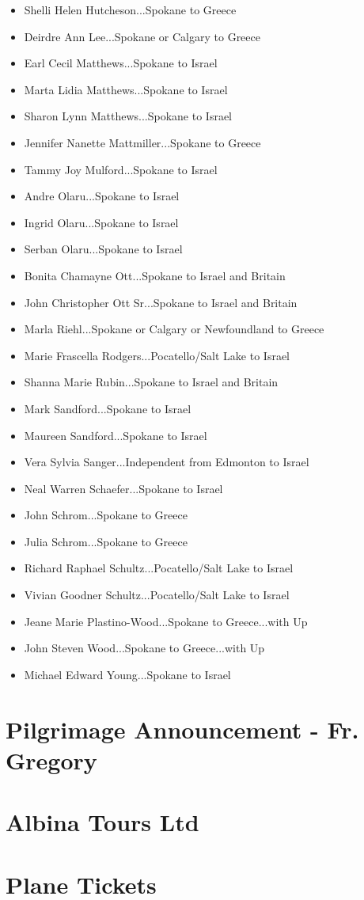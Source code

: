 \documentclass[letterpaper]{report}
\begin{document}
\begin{appendix}
\begin{itemize}
		\item Shelli Helen Hutcheson...Spokane to Greece
		\item Deirdre Ann Lee...Spokane or Calgary to Greece
		\item Earl Cecil Matthews...Spokane to Israel
		\item Marta Lidia Matthews...Spokane to Israel
		\item Sharon Lynn Matthews...Spokane to Israel
		\item Jennifer Nanette Mattmiller...Spokane to Greece
		\item Tammy Joy Mulford...Spokane to Israel
		\item Andre Olaru...Spokane to Israel
		\item Ingrid Olaru...Spokane to Israel
		\item Serban Olaru...Spokane to Israel
		\item Bonita Chamayne Ott...Spokane to Israel and Britain
		\item John Christopher Ott Sr...Spokane to Israel and Britain
		\item Marla Riehl...Spokane or Calgary or Newfoundland to Greece
		\item Marie Frascella Rodgers...Pocatello/Salt Lake to Israel
		\item Shanna Marie Rubin...Spokane to Israel and Britain
		\item Mark Sandford...Spokane to Israel
		\item Maureen Sandford...Spokane to Israel
		\item Vera Sylvia Sanger...Independent from Edmonton to Israel
		\item Neal Warren Schaefer...Spokane to Israel
		\item John Schrom...Spokane to Greece
		\item Julia Schrom...Spokane to Greece
		\item Richard Raphael Schultz...Pocatello/Salt Lake to Israel
		\item Vivian Goodner Schultz...Pocatello/Salt Lake to Israel
		\item Jeane Marie Plastino-Wood...Spokane to Greece...with Up
		\item John Steven Wood...Spokane to Greece...with Up
		\item Michael Edward Young...Spokane to Israel
	\end{itemize}
	\chapter{Pilgrimage Announcement - Fr. Gregory}
	\clearpage
	
	\chapter{Albina Tours Ltd}
	\clearpage
	
	\chapter{Plane Tickets}
	\clearpage
	

\end{appendix}
\end{document}
